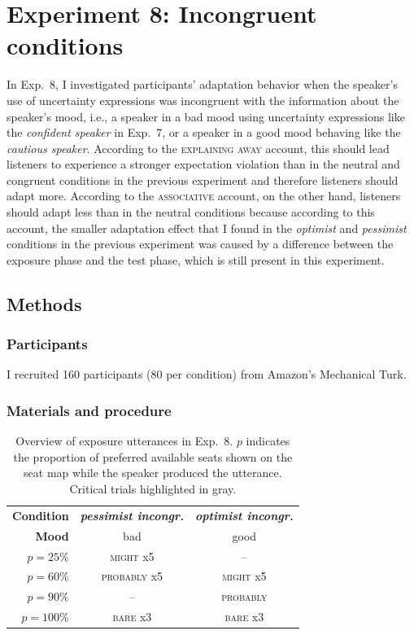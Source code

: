 \section{Experiment 8: Incongruent conditions}

In Exp.~8, I investigated participants' adaptation behavior when the speaker's use of uncertainty expressions was incongruent with the information about the speaker's mood, i.e., a speaker in a bad mood using uncertainty expressions like the \textit{confident speaker} in Exp.~7, or a speaker in a good mood behaving like the \textit{cautious speaker}. According to the \textsc{explaining away} account, this should lead listeners to experience a stronger expectation violation than in the neutral and congruent conditions in the previous experiment and therefore listeners should adapt more.  According to the \textsc{associative} account, on the other hand, listeners should adapt less than in the neutral conditions because according to this account, the smaller adaptation effect that I found in the \textit{optimist} and \textit{pessimist} conditions in the previous experiment was caused by a difference between the exposure phase and the test phase, which is still present in this experiment.


\subsection{Methods}

\subsubsection{Participants} I recruited 160 participants (80 per condition) from Amazon's Mechanical Turk.

\subsubsection{Materials and procedure}

\begin{table}
\centering
\begin{tabular}{r|c | c }
\toprule 
     \textbf{Condition} & \textit{\textbf{pessimist incongr.}} & \textit{\textbf{optimist incongr.}} \\
     \textbf{Mood} & bad  & good  \\ \midrule
     $p=25\%$ & \textsc{might} x5 & -- \\
     \cellcolor{LightGray} $p=60\%$ &  \cellcolor{LightGray} \textsc{probably} x5 & \cellcolor{LightGray} \textsc{might} x5 \\
     $p=90\%$ & -- &  \textsc{probably}  \\
     $p=100\%$ & {\textsc{bare} x3} & {\textsc{bare} x3} \\
     \bottomrule
\end{tabular}
\caption{Overview of exposure utterances in Exp.~8. $p$ indicates the proportion of preferred available seats shown on the seat map while the speaker produced the utterance. Critical trials highlighted in gray.\label{tbl:exposure-overview-exp8}}
\end{table}


